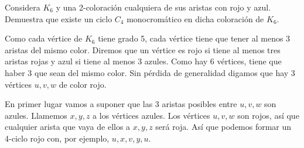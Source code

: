 \documentclass[twoside]{article}
\begin{document}
\begin{ejercicio}{2.5}

Considera $K_6$ y una 2-coloración cualquiera de sus aristas con rojo y azul. Demuestra que
existe un ciclo $C_4$ monocromático en dicha coloración de $K_6$.
\end{ejercicio}
\begin{solucion}
 Como cada vértice de $K_6$ tiene grado 5, cada vértice tiene que tener al menos 3 aristas del mismo color. Diremos que un vértice es rojo si tiene al menos tres aristas rojas y azul si tiene al menos 3 azules. Como hay 6 vértices, tiene que haber 3 que sean del mismo color. Sin pérdida de generalidad digamos que hay 3 vértices $u,v,w$ de color rojo. 
 
 En primer lugar vamos a suponer que las 3 aristas posibles entre $u,v,w$ son azules. Llamemos $x,y,z$ a los vértices azules. Los vértices $u,v,w$ son rojos, así que cualquier arista que vaya de ellos a $x,y,z$ será roja. Así que podemos formar un 4-ciclo rojo con, por ejemplo, $u, x,v,y,u$. 
 

\end{solucion}
\end{document}
